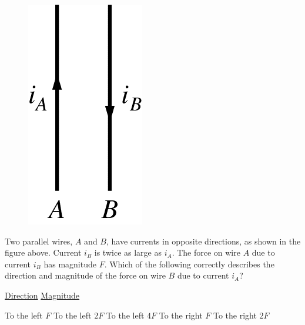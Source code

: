 \begin{figure}[H]
\centering
\includegraphics[scale=0.3]{images/img-012-037.png}
\end{figure}

\begin{questions}\setcounter{question}{27}\question
Two parallel wires, $A$ and $B$, have currents in opposite directions, as shown in the figure above. Current $i_{B}$ is twice as large as $i_{A}$. The force on wire $A$ due to current $i_{B}$ has magnitude $F$. Which of the following correctly describes the direction and magnitude of the force on wire $B$ due to current $i_{A}$?

\tabto{0.75cm}\underline{Direction}
\tabto{4.00cm}\underline{Magnitude}

\begin{choices}
\choice To the left  \tabto{3.25cm} $F$
\choice To the left  \tabto{3.25cm} $2 F$
\choice To the left  \tabto{3.25cm} $4 F$
\choice To the right \tabto{3.25cm} $F$
\choice To the right \tabto{3.25cm} $2 F$
\end{choices}\end{questions}

